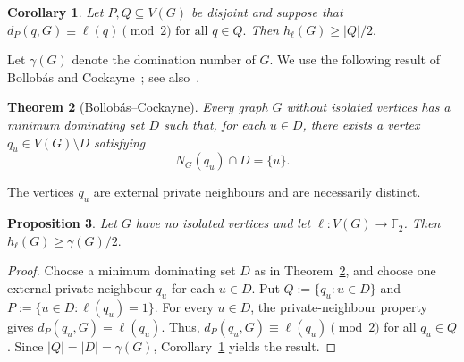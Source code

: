 \documentclass[10pt,a4paper]{amsart}
\newtheorem{theorem}{Theorem}
\newtheorem{proposition}[theorem]{Proposition}
\newtheorem{corollary}[theorem]{Corollary}
\newtheorem{remark}[theorem]{Remark}
\newcommand{\F}{\mathbb{F}}
\newcommand{\1}{\mathbf{1}}
\begin{document}
	\begin{corollary}\label{cor:one-sided}
		Let $P,Q\subseteq V(G)$ be disjoint and suppose that
		$
		d_P(q,G)\equiv \ell(q)\pmod 2
		\mbox{ for all } q\in Q.
		$
		Then
		$
		h_\ell(G)\ge |Q|/2.
		$
	\end{corollary}
	
	
	Let $\gamma(G)$ denote the domination number of $G$.  We use the following
	result of Bollob\'as and Cockayne~\cite{BC}; see also~\cite{Haynes}.
	
	\begin{theorem}[Bollob\'as--Cockayne]\label{thm:BC}
		Every graph $G$ without isolated vertices has a minimum dominating set
		$D$ such that, for each $u\in D$, there exists a vertex
		$q_u\in V(G)\setminus D$ satisfying
		\[
		N_G(q_u)\cap D=\{u\}.
		\]
	\end{theorem}
	
	The vertices $q_u$ are external private neighbours and are necessarily
	distinct.
	
	\begin{proposition}\label{prop:gamma}
		Let $G$ have no isolated vertices and let $\ell:V(G)\to\F_2$.  Then
		$ h_\ell(G)\ge \gamma(G)/2.$
	\end{proposition}
	\begin{proof}
		Choose a minimum dominating set $D$ as in Theorem~\ref{thm:BC}, and choose
		one external private neighbour $q_u$ for each $u\in D$.  Put
		$
		Q:=\{q_u:u\in D\}
		$
		and
		$
		P:=\{u\in D:\ell(q_u)=1\}.
		$
		For every $u\in D$, the private-neighbour property gives
		$d_P(q_u,G)=\ell(q_u).$ Thus, $d_P(q_u,G)\equiv\ell(q_u)\pmod2$ for all $q_u\in Q$.  Since
		$|Q|=|D|=\gamma(G)$, Corollary~\ref{cor:one-sided} yields the result.
	\end{proof}
	
\end{document}
